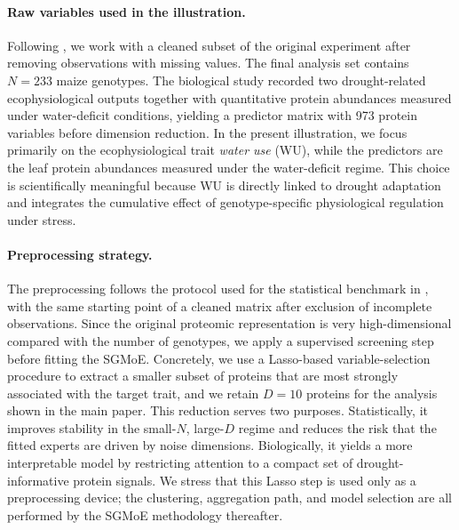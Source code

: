 \documentclass[twoside]{article}
\theoremstyle{plain}
\theoremstyle{definition}
\theoremstyle{plain}
\begin{document}
\paragraph{Raw variables used in the illustration.}
Following \citet{10.1093/jrsssc/qlae012}, we work with a cleaned subset of the original experiment after removing observations with missing values. The final analysis set contains $N=233$ maize genotypes. The biological study recorded two drought-related ecophysiological outputs together with quantitative protein abundances measured under water-deficit conditions, yielding a predictor matrix with 973 protein variables before dimension reduction. In the present illustration, we focus primarily on the ecophysiological trait \emph{water use} (WU), while the predictors are the leaf protein abundances measured under the water-deficit regime. This choice is scientifically meaningful because WU is directly linked to drought adaptation and integrates the cumulative effect of genotype-specific physiological regulation under stress.

\paragraph{Preprocessing strategy.}
The preprocessing follows the protocol used for the statistical benchmark in \citet{10.1093/jrsssc/qlae012}, with the same starting point of a cleaned matrix after exclusion of incomplete observations. Since the original proteomic representation is very high-dimensional compared with the number of genotypes, we apply a supervised screening step before fitting the SGMoE. Concretely, we use a Lasso-based variable-selection procedure to extract a smaller subset of proteins that are most strongly associated with the target trait, and we retain $D=10$ proteins for the analysis shown in the main paper. This reduction serves two purposes. Statistically, it improves stability in the small-$N$, large-$D$ regime and reduces the risk that the fitted experts are driven by noise dimensions. Biologically, it yields a more interpretable model by restricting attention to a compact set of drought-informative protein signals. We stress that this Lasso step is used only as a preprocessing device; the clustering, aggregation path, and model selection are all performed by the SGMoE methodology thereafter.
\end{document}
